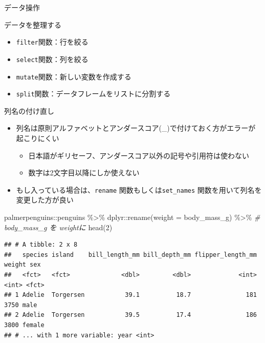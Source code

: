 \documentclass[
  ignorenonframetext,
]{beamer}
\newenvironment{Shaded}{\begin{snugshade}}{\end{snugshade}}
\newcommand{\AttributeTok}[1]{\textcolor[rgb]{0.77,0.63,0.00}{#1}}
\newcommand{\CommentTok}[1]{\textcolor[rgb]{0.56,0.35,0.01}{\textit{#1}}}
\newcommand{\DecValTok}[1]{\textcolor[rgb]{0.00,0.00,0.81}{#1}}
\newcommand{\FunctionTok}[1]{\textcolor[rgb]{0.00,0.00,0.00}{#1}}
\newcommand{\NormalTok}[1]{#1}
\newcommand{\SpecialCharTok}[1]{\textcolor[rgb]{0.00,0.00,0.00}{#1}}
\providecommand{\tightlist}{%
  \setlength{\itemsep}{0pt}\setlength{\parskip}{0pt}}
\begin{document}
\begin{frame}[fragile]{データ操作}
\begin{block}{データを整理する}
\begin{itemize}
  \begin{itemize}
  \tightlist
  \item
    \texttt{filter}関数：行を絞る
  \item
    \texttt{select}関数：列を絞る
  \item
    \texttt{mutate}関数：新しい変数を作成する
  \item
    \texttt{split}関数：データフレームをリストに分割する
  \end{itemize}
\end{itemize}
\end{block}

\begin{block}{列名の付け直し}
\protect\hypertarget{ux5217ux540dux306eux4ed8ux3051ux76f4ux3057}{}
\begin{itemize}
\tightlist
\item
  列名は原則アルファベットとアンダースコア(\_)で付けておく方がエラーが起こりにくい

  \begin{itemize}
  \tightlist
  \item
    日本語がギリセーフ、アンダースコア以外の記号や引用符は使わない
  \item
    数字は2文字目以降にしか使えない
  \end{itemize}
\item
  もし入っている場合は、\texttt{rename} 関数もしくは\texttt{set\_names}
  関数を用いて列名を変更した方が良い
\end{itemize}

\begin{Shaded}
\begin{Highlighting}[]
\NormalTok{palmerpenguins}\SpecialCharTok{::}\NormalTok{penguins }\SpecialCharTok{\%\textgreater{}\%}
\NormalTok{  dplyr}\SpecialCharTok{::}\FunctionTok{rename}\NormalTok{(}\AttributeTok{weight =}\NormalTok{ body\_mass\_g) }\SpecialCharTok{\%\textgreater{}\%} \CommentTok{\# body\_mass\_g を weightに}
  \FunctionTok{head}\NormalTok{(}\DecValTok{2}\NormalTok{)}
\end{Highlighting}
\end{Shaded}

\begin{verbatim}
## # A tibble: 2 x 8
##   species island    bill_length_mm bill_depth_mm flipper_length_mm weight sex   
##   <fct>   <fct>              <dbl>         <dbl>             <int>  <int> <fct> 
## 1 Adelie  Torgersen           39.1          18.7               181   3750 male  
## 2 Adelie  Torgersen           39.5          17.4               186   3800 female
## # ... with 1 more variable: year <int>
\end{verbatim}
\end{block}


\end{frame}
\end{document}

